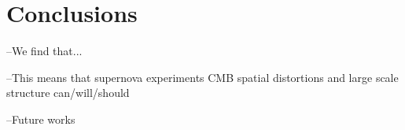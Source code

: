 \documentclass[aps,prd,preprint,groupedaddress]{revtex4-1}
\begin{document}
\section{Conclusions \label{sec:conclusions}}
--We find that...

--This means that supernova experiments CMB spatial distortions and large scale structure can/will/should

--Future works

%


\appendix
\end{document}
